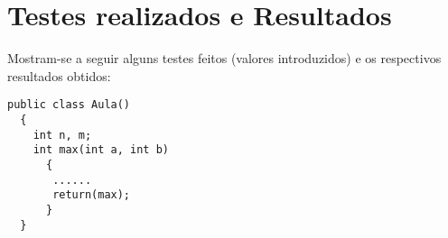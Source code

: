 \documentclass{report}
\def\darius{\textsf{Darius}\xspace}
\def\antlr{\texttt{AnTLR}\xspace}
\begin{document}
\section{Testes realizados e Resultados}
Mostram-se a seguir alguns testes feitos (valores introduzidos) e
os respectivos resultados obtidos:








\begin{verbatim}
public class Aula()
  {
    int n, m;
    int max(int a, int b)
      {
       ......
       return(max);
      }
  }
\end{verbatim}




%
%
\end{document}
